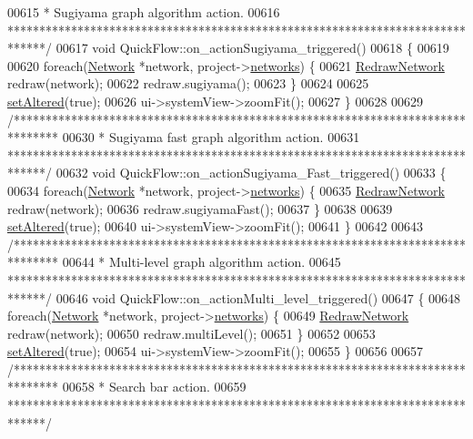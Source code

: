 \begin{DoxyCode}
00615 \textcolor{comment}{ * Sugiyama graph algorithm action.}
00616 \textcolor{comment}{ ******************************************************************************/}
00617 \textcolor{keywordtype}{void} QuickFlow::on\_actionSugiyama\_triggered()
00618 \{
00619 
00620   \textcolor{keywordflow}{foreach}(\hyperlink{class_network}{Network} *network, project->\hyperlink{class_project_aa98126154cab59769a431668e6f17daf}{networks}) \{
00621     \hyperlink{class_redraw_network}{RedrawNetwork} redraw(network);
00622     redraw.sugiyama();
00623   \}
00624 
00625   \hyperlink{group___window_ga4b63ea5ca52a9eea14db0a22b5a133f8}{setAltered}(\textcolor{keyword}{true});
00626   ui->systemView->zoomFit();
00627 \}
00628 
00629 \textcolor{comment}{/*******************************************************************************}
00630 \textcolor{comment}{ * Sugiyama fast graph algorithm action.}
00631 \textcolor{comment}{ ******************************************************************************/}
00632 \textcolor{keywordtype}{void} QuickFlow::on\_actionSugiyama\_Fast\_triggered()
00633 \{
00634   \textcolor{keywordflow}{foreach}(\hyperlink{class_network}{Network} *network, project->\hyperlink{class_project_aa98126154cab59769a431668e6f17daf}{networks}) \{
00635     \hyperlink{class_redraw_network}{RedrawNetwork} redraw(network);
00636     redraw.sugiyamaFast();
00637   \}
00638 
00639   \hyperlink{group___window_ga4b63ea5ca52a9eea14db0a22b5a133f8}{setAltered}(\textcolor{keyword}{true});
00640   ui->systemView->zoomFit();
00641 \}
00642 
00643 \textcolor{comment}{/*******************************************************************************}
00644 \textcolor{comment}{ *  Multi-level graph algorithm action.}
00645 \textcolor{comment}{ ******************************************************************************/}
00646 \textcolor{keywordtype}{void} QuickFlow::on\_actionMulti\_level\_triggered()
00647 \{
00648   \textcolor{keywordflow}{foreach}(\hyperlink{class_network}{Network} *network, project->\hyperlink{class_project_aa98126154cab59769a431668e6f17daf}{networks}) \{
00649     \hyperlink{class_redraw_network}{RedrawNetwork} redraw(network);
00650     redraw.multiLevel();
00651   \}
00652 
00653   \hyperlink{group___window_ga4b63ea5ca52a9eea14db0a22b5a133f8}{setAltered}(\textcolor{keyword}{true});
00654   ui->systemView->zoomFit();
00655 \}
00656 
00657 \textcolor{comment}{/*******************************************************************************}
00658 \textcolor{comment}{ * Search bar action.}
00659 \textcolor{comment}{ ******************************************************************************/}

\end{DoxyCode}
